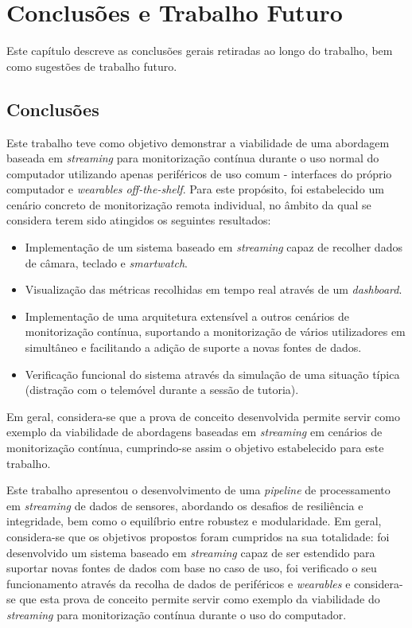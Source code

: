 \chapter{Conclusões e Trabalho Futuro}
\label{chap:conclusions}

\begin{introduction}
Este capítulo descreve as conclusões gerais retiradas ao longo do trabalho, bem como sugestões de trabalho futuro.
\end{introduction}


\section{Conclusões}

Este trabalho teve como objetivo demonstrar a viabilidade de uma abordagem baseada em \textit{streaming} para monitorização contínua durante o uso normal do computador utilizando apenas periféricos de uso comum - interfaces do próprio computador e \textit{wearables off-the-shelf}.
Para este propósito, foi estabelecido um cenário concreto de monitorização remota individual, no âmbito da qual se considera terem sido atingidos os seguintes resultados:
\begin{itemize}
    \item Implementação de um sistema baseado em \textit{streaming} capaz de recolher dados de câmara, teclado e \textit{smartwatch}.
    \item Visualização das métricas recolhidas em tempo real através de um \textit{dashboard}.
    \item Implementação de uma arquitetura extensível a outros cenários de monitorização contínua, suportando a monitorização de vários utilizadores em simultâneo e facilitando a adição de suporte a novas fontes de dados.
    \item Verificação funcional do sistema através da simulação de uma situação típica (distração com o telemóvel durante a sessão de tutoria).
\end{itemize}

Em geral, considera-se que a prova de conceito desenvolvida permite servir como exemplo da viabilidade de abordagens baseadas em \textit{streaming} em cenários de monitorização contínua, cumprindo-se assim o objetivo estabelecido para este trabalho.

Este trabalho apresentou o desenvolvimento de uma \textit{pipeline} de processamento em \textit{streaming} de dados de sensores, abordando os desafios de resiliência e integridade, bem como o equilíbrio entre robustez e modularidade.
Em geral, considera-se que os objetivos propostos foram cumpridos na sua totalidade: foi desenvolvido um sistema baseado em \textit{streaming} capaz de ser estendido para suportar novas fontes de dados com base no caso de uso, foi verificado o seu funcionamento através da recolha de dados de periféricos e \textit{wearables} e considera-se que esta prova de conceito permite servir como exemplo da viabilidade do \textit{streaming} para monitorização contínua durante o uso do computador.

